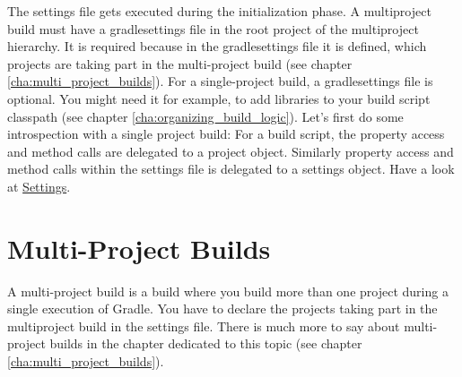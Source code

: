 The settings file gets executed during the initialization phase. A multiproject build must have a gradlesettings file in the root project of the multiproject hierarchy. It is required because in the gradlesettings file it is defined, which projects are taking part in the multi-project build (see chapter \ref{cha:multi_project_builds}). For a single-project build, a gradlesettings file is optional. You might need it for example, to add libraries to your build script classpath (see chapter \ref{cha:organizing_build_logic}). Let's first do some introspection with a single project build:
For a build script, the property access and method calls are delegated to a project object. Similarly property access and method calls within the settings file is delegated to a settings object. Have a look at \href{\API Settings.html}{\PKG Settings}.

\section{Multi-Project Builds} %
\label{sec:multi_project_builds}
A multi-project build is a build where you build more than one project during a single execution of Gradle. You have to declare the projects taking part in the multiproject build in the settings file. 
There is much more to say about multi-project builds in the chapter dedicated to this topic (see chapter \ref{cha:multi_project_builds}). 

